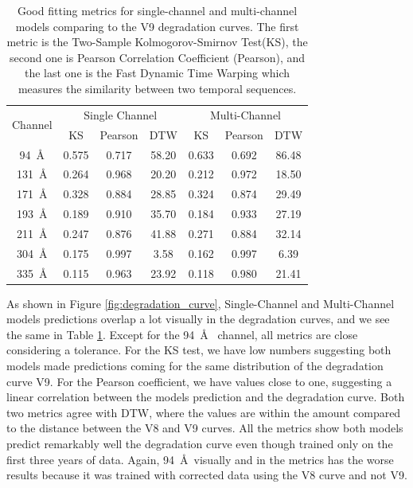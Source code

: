 \documentclass[twocolumn,usenames,dvipsnames]{aastex63}
\begin{document}
\begin{table}[h]
  \centering
  \caption{Good fitting metrics for single-channel and multi-channel models comparing to the V9 degradation curves. The first metric is the Two-Sample Kolmogorov-Smirnov Test(KS), the second one is Pearson Correlation Coefficient (Pearson), and the last one is the Fast Dynamic Time Warping which measures the similarity between two temporal sequences.}
  \label{tab:quantities_degradation}
  \centering
  \begin{tabular}{ccccccc}
    \toprule
    \multirow{2}{*}{Channel} & \multicolumn{3}{c}{{\centering Single Channel}} &  \multicolumn{3}{c}{{\centering Multi-Channel}}  \\
    \cmidrule(lr){2-4}\cmidrule(lr){5-7}
     & KS & Pearson & DTW &  KS & Pearson & DTW\\
     \midrule
     94~\AA  &  0.575 & 0.717 & 58.20 &  0.633 & 0.692 & 86.48\\
     131~\AA &  0.264 & 0.968 & 20.20 &  0.212 & 0.972 & 18.50\\
     171~\AA &  0.328 & 0.884 & 28.85 &  0.324 & 0.874 & 29.49\\
     193~\AA &  0.189 & 0.910 & 35.70 &  0.184 & 0.933 & 27.19\\
     211~\AA &  0.247 & 0.876 & 41.88 &  0.271 & 0.884 & 32.14\\
     304~\AA &  0.175 & 0.997 &  3.58 &  0.162 & 0.997 &  6.39\\
     335~\AA &  0.115 & 0.963 & 23.92 &  0.118 & 0.980 & 21.41\\
     \bottomrule
  \end{tabular}
\end{table}

As shown in Figure \ref{fig:degradation_curve}, Single-Channel and Multi-Channel models predictions overlap a lot visually in the degradation curves, and we see the same in Table \ref{tab:quantities_degradation}. Except for the 94~\AA~ channel, all metrics are close considering a tolerance. For the KS test, we have low numbers suggesting both models made predictions coming for the same distribution of the degradation curve V9. For the Pearson coefficient, we have values close to one, suggesting a linear correlation between the models prediction and the degradation curve. Both two metrics agree with DTW, where the values are within the amount compared to the distance between the V8 and V9 curves. All the metrics show both models predict remarkably well the degradation curve even though trained only on the first three years of data. Again, 94~\AA~visually and in the metrics has the worse results because it was trained with corrected data using the V8 curve and not V9.
\end{document}
